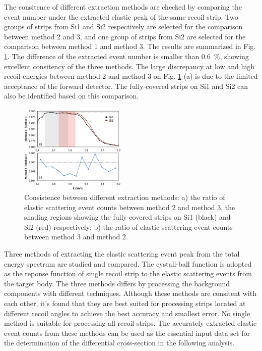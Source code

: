 \documentclass[fleqn,twocolumn,a4paper]{ikpar}
\begin{document}
The consitence of different extraction methods are checked by comparing the event
number under the extracted elastic peak of the same recoil strip.
Two groups of strips from Si1 and Si2 respectively are selected for the
comparison between method 2 and 3, and one group of strips from Si2 are selected
for the comparison between method 1 and method 3.
The results are summarized in Fig. \ref{fig:extraction_consistence}.
The difference of the extracted event number is smaller than \SI{0.6}{\percent},
showing excellent consitency of the three methods.
The large discrepancy at low and high recoil energies between method 2 and
method 3 on Fig. \ref{fig:extraction_consistence} (a) is due to the limited
acceptance of the forward detector.
The fully-covered strips on Si1 and Si2 can also be identified based on this comparison.
\begin{figure}[!htb]
	\includegraphics[width=0.45\textwidth]{./comparison_methods.png}
  \caption{Consistence between different extraction
    methods: a) the ratio of elastic scattering event counts between method 2 and
    method 3, the shading regions showing the fully-covered strips on Si1
    (black) and Si2 (red) respectively; b) the ratio of elastic scattering event counts between method 3 and
    method 2.}
  \label{fig:extraction_consistence}
\end{figure}

\par
\medskip

Three methods of extracting the elastic scattering event peak from the total
energy spectrum are studied and compared.
The cystall-ball function is adopted as the reponse function of single recoil strip to the
elastic scattering events from the target body.
The three methods differs by processing the background components with different techniques.
Although these methods are consitent with each other, it's found that they are best suited for
processing strips located at different recoil angles to achieve the best accuracy
and smallest error.
No single method is suitable for processing all recoil strips.
The accurately extracted elastic event counts from these methods can be used as
the essential input data set for the determination of the differential cross-section in the following analysis.
\end{document}
